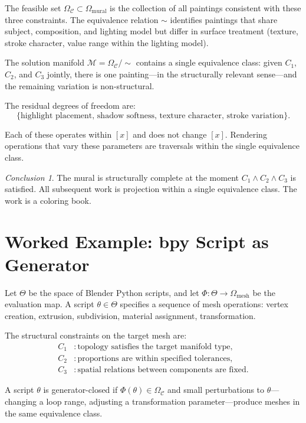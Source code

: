 \documentclass[12pt, twoside]{article}
\theoremstyle{plain}
\theoremstyle{definition}
\theoremstyle{remark}
\newtheorem{conclusion}[theorem]{Conclusion}
\newcommand{\OmC}{\Omega_{\mathcal{C}}}
\begin{document}
The feasible set $\OmC \subset \Omega_{\text{mural}}$ is the collection of all paintings consistent with these three constraints. The equivalence relation $\sim$ identifies paintings that share subject, composition, and lighting model but differ in surface treatment (texture, stroke character, value range within the lighting model).

The solution manifold $\mathcal{M} = \OmC / {\sim}$ contains a single equivalence class: given $C_1$, $C_2$, and $C_3$ jointly, there is one painting---in the structurally relevant sense---and the remaining variation is non-structural.

The residual degrees of freedom are:
\[
\{ \text{highlight placement, shadow softness, texture character, stroke variation} \}.
\]

Each of these operates within $[x]$ and does not change $[x]$. Rendering operations that vary these parameters are traversals within the single equivalence class.

\begin{conclusion}
The mural is structurally complete at the moment $C_1 \wedge C_2 \wedge C_3$ is satisfied. All subsequent work is projection within a single equivalence class. The work is a coloring book.
\end{conclusion}

\section{Worked Example: bpy Script as Generator}
\label{app:bpy}

Let $\Theta$ be the space of Blender Python scripts, and let $\Phi : \Theta \to \Omega_{\text{mesh}}$ be the evaluation map. A script $\theta \in \Theta$ specifies a sequence of mesh operations: vertex creation, extrusion, subdivision, material assignment, transformation.

The structural constraints on the target mesh are:
\begin{align*}
C_1 &: \text{topology satisfies the target manifold type}, \\
C_2 &: \text{proportions are within specified tolerances}, \\
C_3 &: \text{spatial relations between components are fixed}.
\end{align*}

A script $\theta$ is generator-closed if $\Phi(\theta) \in \OmC$ and small perturbations to $\theta$---changing a loop range, adjusting a transformation parameter---produce meshes in the same equivalence class.
\end{document}
